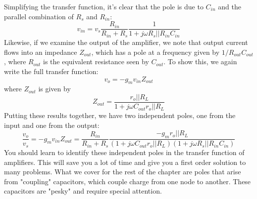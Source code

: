 Simplifying the transfer function, it's clear that the pole is due to $C_{in}$ and the parallel combination of $R_s $ and $R_{in}$:
    \begin{equation}
        v_{in} = v_s \frac{R_{in}}{R_{in} + R_s} \frac{1}{ 1 + j\omega R_s || R_{in} C_{in}} 
    \end{equation}
Likewise, if we examine the output of the amplifier, we note that output current flows into an impedance $Z_{out}$, which has a pole at a frequency given by $1/R_{out}C_{out}$, where $R_{out}$ is the equivalent resistance seen by $C_{out}$.  To show this, we again write the full transfer function:
    \begin{equation}
        v_o = -g_m v_{in} Z_{out} 
    \end{equation}
where $Z_{out}$ is given by
    \begin{equation}
        Z_{out} = \frac{r_o || R_L}{1 + j\omega C_{out} r_o || R_L}
    \end{equation}
Putting these results together, we have two independent poles, one from the input and one from the output:
    \begin{equation}
        \frac{v_o}{v_s} = -g_m v_{in} Z_{out} = \frac{R_{in}}{R_{in} + R_s} \frac{-g_m r_o || R_L}{(1 + j\omega C_{out} r_o || R_L)(1 + j\omega R_s || R_{in} C_{in})}
    \end{equation}
You should learn to identify these independent poles in the transfer function of amplifiers.  This will save you a lot of time and give you a first order solution to many problems.  What we cover for the rest of the chapter are poles that arise from "coupling" capacitors, which couple charge from one node to another. These capacitors are "pesky" and require special attention.
